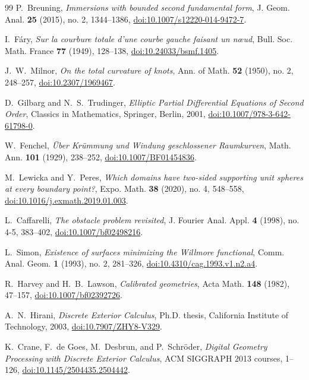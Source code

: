 \documentclass[11pt,reqno]{amsart}
\theoremstyle{definition}
\numberwithin{equation}{section}
\begin{document}
\begin{thebibliography}{99}
P.~Breuning,
\emph{Immersions with bounded second fundamental form},
J. Geom. Anal. \textbf{25} (2015), no. 2, 1344--1386, \href{https://doi.org/10.1007/s12220-014-9472-7}{doi:10.1007/s12220-014-9472-7}.

I.~F\'ary,
\emph{Sur la courbure totale d'une courbe gauche faisant un n\oe ud},
Bull. Soc. Math. France \textbf{77} (1949), 128--138, \href{https://doi.org/10.24033/bsmf.1405}{doi:10.24033/bsmf.1405}.

J.~W.~Milnor,
\emph{On the total curvature of knots},
Ann. of Math. \textbf{52} (1950), no. 2, 248--257, \href{https://doi.org/10.2307/1969467}{doi:10.2307/1969467}.

D.~Gilbarg and N.~S.~Trudinger,
\emph{Elliptic Partial Differential Equations of Second Order},
Classics in Mathematics, Springer, Berlin, 2001, \href{https://doi.org/10.1007/978-3-642-61798-0}{doi:10.1007/978-3-642-61798-0}.

W.~Fenchel,
\emph{\"Uber Kr\"ummung und Windung geschlossener Raumkurven},
Math. Ann. \textbf{101} (1929), 238--252, \href{https://doi.org/10.1007/BF01454836}{doi:10.1007/BF01454836}.

M.~Lewicka and Y.~Peres,
\emph{Which domains have two-sided supporting unit spheres at every boundary point?},
Expo. Math. \textbf{38} (2020), no. 4, 548--558, \href{https://doi.org/10.1016/j.exmath.2019.01.003}{doi:10.1016/j.exmath.2019.01.003}.

L.~Caffarelli,
\emph{The obstacle problem revisited},
J. Fourier Anal. Appl. \textbf{4} (1998), no. 4-5, 383--402, \href{https://doi.org/10.1007/bf02498216}{doi:10.1007/bf02498216}.

L.~Simon,
\emph{Existence of surfaces minimizing the Willmore functional},
Comm. Anal. Geom. \textbf{1} (1993), no. 2, 281--326, \href{https://doi.org/10.4310/cag.1993.v1.n2.a4}{doi:10.4310/cag.1993.v1.n2.a4}.

R.~Harvey and H.~B.~Lawson,
\emph{Calibrated geometries},
Acta Math. \textbf{148} (1982), 47--157, \href{https://doi.org/10.1007/bf02392726}{doi:10.1007/bf02392726}.

A.~N.~Hirani,
\emph{Discrete Exterior Calculus},
Ph.D. thesis, California Institute of Technology, 2003, \href{https://doi.org/10.7907/ZHY8-V329}{doi:10.7907/ZHY8-V329}.

K.~Crane, F.~de Goes, M.~Desbrun, and P.~Schr{\"o}der,
\emph{Digital Geometry Processing with Discrete Exterior Calculus},
ACM SIGGRAPH 2013 courses, 1--126, \href{https://doi.org/10.1145/2504435.2504442}{doi:10.1145/2504435.2504442}.


\end{thebibliography}
\end{document}
